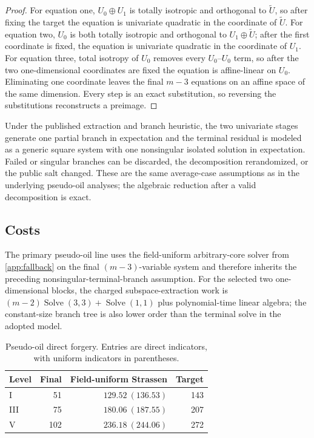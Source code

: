 \documentclass[10pt,a4paper]{article}
\newcommand{\Solve}{\operatorname{Solve}}
\begin{document}
\begin{proof}
For equation one, $U_0\oplus U_1$ is totally isotropic and orthogonal to $\widetilde U$, so after fixing the target the equation is univariate quadratic in the coordinate of $\widetilde U$.  For equation two, $U_0$ is both totally isotropic and orthogonal to $U_1\oplus\widetilde U$; after the first coordinate is fixed, the equation is univariate quadratic in the coordinate of $U_1$.  For equation three, total isotropy of $U_0$ removes every $U_0$--$U_0$ term, so after the two one-dimensional coordinates are fixed the equation is affine-linear on $U_0$.  Eliminating one coordinate leaves the final $m-3$ equations on an affine space of the same dimension.  Every step is an exact substitution, so reversing the substitutions reconstructs a preimage.
\end{proof}

Under the published extraction and branch heuristic, the two univariate stages generate one partial branch in expectation and the terminal residual is modeled as a generic square system with one nonsingular isolated solution in expectation.  Failed or singular branches can be discarded, the decomposition rerandomized, or the public salt changed.  These are the same average-case assumptions as in the underlying pseudo-oil analyses; the algebraic reduction after a valid decomposition is exact.

\subsection{Costs}

The primary pseudo-oil line uses the field-uniform arbitrary-core solver from \cref{app:fallback} on the final $(m-3)$-variable system and therefore inherits the preceding nonsingular-terminal-branch assumption.  For the selected two one-dimensional blocks, the charged subspace-extraction work is $(m-2)\Solve(3,3)+\Solve(1,1)$ plus polynomial-time linear algebra; the constant-size branch tree is also lower order than the terminal solve in the adopted model.

\begin{table}[H]
\centering
\small
\setlength{\tabcolsep}{3pt}
\caption{Pseudo-oil direct forgery.  Entries are direct indicators, with uniform indicators in parentheses.}
\label{tab:pseudo-oil}
\begin{tabular}{@{}lrrr@{}}
\toprule
Level & Final & Field-uniform Strassen & Target\\
\midrule
I   & 51  & $129.52\ (136.53)$ & 143\\
III & 75  & $180.06\ (187.55)$ & 207\\
V   & 102 & $236.18\ (244.06)$ & 272\\
\bottomrule
\end{tabular}
\end{table}
\end{document}
